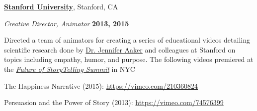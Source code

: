 \documentclass[10pt]{article}
\newcommand{\halfblankline}{\quad\vspace{-0.5\baselineskip}\pagebreak[3]}
\begin{document}
\href{https://www.stanford.edu/}{\textbf{Stanford University}},
Stanford, CA
\begin{outerlist}
	
	\item[] \textit{Creative Director, Animator}%
	\hfill \textbf{2013, 2015}
	\begin{innerlist}
		\item Directed a team of animators for creating a series of educational videos detailing scientific research done by \href{https://www.gsb.stanford.edu/faculty-research/faculty/jennifer-lynn-aaker} {Dr. Jennifer Aaker} and colleagues at Stanford on topics including empathy, humor, and purpose. The following videos premiered at the \href{https://futureofstorytelling.org/summit}{\emph{Future of StoryTelling Summit}} in NYC
		 \begin{innerlist}
			\item The Happiness Narrative (2015): \href{https://vimeo.com/210360824} {https://vimeo.com/210360824}
			\item Persuasion and the Power of Story (2013): \href{https://vimeo.com/74576399} {https://vimeo.com/74576399}
		\end{innerlist}
	\end{innerlist}
	
	\halfblankline
	
\end{outerlist}
\end{document}
